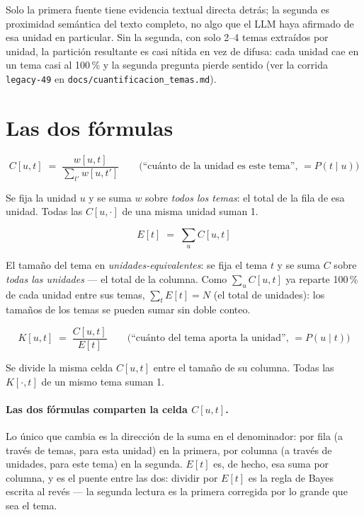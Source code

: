 \documentclass[11pt]{article}
\newcommand{\afinidad}{w}
\begin{document}
Solo la primera fuente tiene evidencia textual directa detrás; la segunda es
proximidad semántica del texto completo, no algo que el LLM haya afirmado de
esa unidad en particular. Sin la segunda, con solo 2--4 temas extraídos por
unidad, la partición resultante es casi nítida en vez de difusa: cada unidad
cae en un tema casi al 100\,\% y la segunda pregunta pierde sentido (ver la
corrida \texttt{legacy-49} en \texttt{docs/cuantificacion\_temas.md}).

\section{Las dos fórmulas}

\begin{equation}
  C[u,t] \;=\; \frac{\afinidad[u,t]}{\displaystyle\sum_{t'} \afinidad[u,t']}
  \qquad\text{(``cuánto de la unidad es este tema'', } = P(t \mid u) \text{)}
\end{equation}

\noindent
Se fija la unidad $u$ y se suma $\afinidad$ sobre \emph{todos los temas}: el
total de la fila de esa unidad. Todas las $C[u,\cdot]$ de una misma unidad
suman 1.

\begin{equation}
  E[t] \;=\; \sum_{u} C[u,t]
  \label{eq:E}
\end{equation}

\noindent
El tamaño del tema en \emph{unidades-equivalentes}: se fija el tema $t$ y se
suma $C$ sobre \emph{todas las unidades} --- el total de la columna. Como
$\sum_u C[u,t] $ ya reparte 100\,\% de cada unidad entre sus temas,
$\sum_t E[t] = N$ (el total de unidades): los tamaños de los temas se pueden
sumar sin doble conteo.

\begin{equation}
  K[u,t] \;=\; \frac{C[u,t]}{E[t]}
  \qquad\text{(``cuánto del tema aporta la unidad'', } = P(u \mid t) \text{)}
\end{equation}

\noindent
Se divide la misma celda $C[u,t]$ entre el tamaño de su columna. Todas las
$K[\cdot,t]$ de un mismo tema suman 1.

\paragraph{Las dos fórmulas comparten la celda $C[u,t]$.} Lo único que
cambia es la dirección de la suma en el denominador: por fila (a través de
temas, para esta unidad) en la primera, por columna (a través de unidades,
para este tema) en la segunda. $E[t]$ es, de hecho, esa suma por columna, y
es el puente entre las dos: dividir por $E[t]$ es la regla de Bayes escrita
al revés --- la segunda lectura es la primera corregida por lo grande que sea
el tema.
\end{document}
